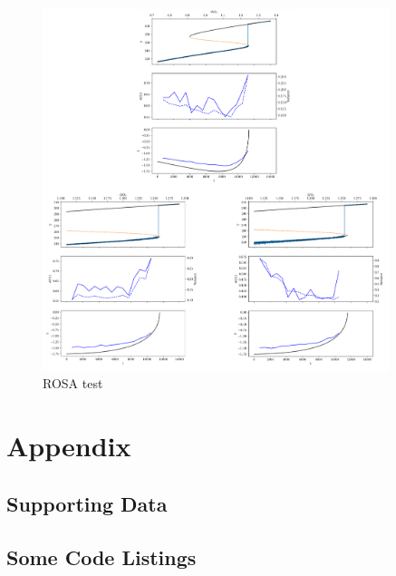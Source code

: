 \documentclass[%
thesis=student,%
coverpage=false,%
titlepage=false,%
headmarks=true, %
german,%
font=libertine, %
math=newpxtx, %
BCOR=5mm,%
coverBCOR=11mm%
]{tumbook}
\begin{document}
\begin{figure}[b]
    \centering
    \includegraphics[width=0.9\textwidth]{bachelor-thesis/figures/ROSA_test_se.jpg}
    \caption{ROSA test}
    \label{fig:ROSA test}
\end{figure}



\appendix
\chapter{Appendix}
\section{Supporting Data}
\section{Some Code Listings}

\backmatter{}
\listoffigures%
\listoftables%

\nocite{Alspach:2008,GaleShapley:1962} %
\printbibliography{} %
\end{document}
